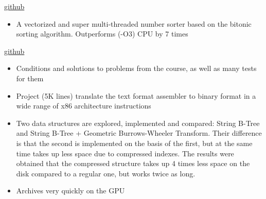 \documentclass[10pt,a4paper]{altacv}
\begin{document}




 {\href{https://github.com/DenRen/HW_Vladimirov/tree/main/hidra}{github}}
\begin{itemize}
  \item \small{A vectorized and super multi-threaded number sorter based on the bitonic sorting algorithm. Outperforms (-O3) CPU by 7 times}
\end{itemize}
\divider

 {\href{https://github.com/DenRen/BabichevAlgo}{github}}
\begin{itemize}
  \item \small{Conditions and solutions to problems from the course, as well as many tests for them}
\end{itemize}
\divider

\begin{itemize}
  \item \small{Project (5K lines) translate the text format assembler to binary format in a wide range of x86 architecture instructions}
\end{itemize}
\divider

\begin{itemize}
  \item \small{Two data structures are explored, implemented and compared: String B-Tree and String B-Tree + Geometric Burrows-Wheeler Transform. Their difference is that the second is implemented on the basis of the first, but at the same time takes up less space due to compressed indexes. The results were obtained that the compressed structure takes up 4 times less space on the disk compared to a regular one, but works twice as long.}
\end{itemize}
\divider

\begin{itemize}
  \item \small{Archives very quickly on the GPU}
\end{itemize}
\divider
\end{document}
